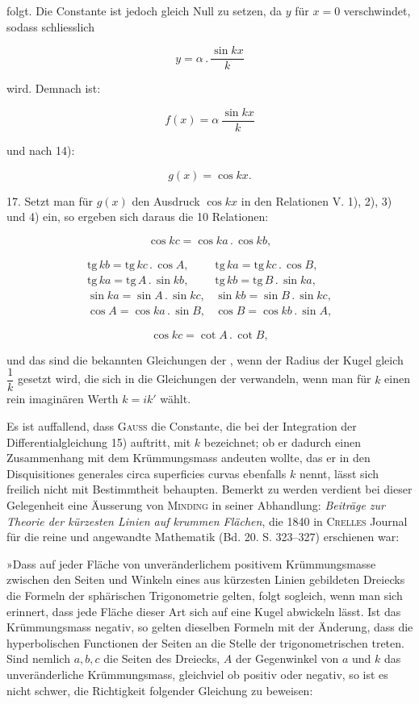%
\noindent folgt. Die Constante ist jedoch gleich Null zu setzen, da $y$ für $x = 0$ verschwindet, sodass schliesslich

\[
y = \alpha \,.\, \frac{\sin kx}{k}
\]

wird. Demnach ist:

\[
f(x) = \alpha\, \frac{\sin kx}{k}
\]

und nach 14):

\[
\tag*{(G)} g(x) = \cos kx.
\]

17. Setzt man für $g(x)$ den Ausdruck $\cos kx$ in den Relationen V. 1), 2), 3) und 4) ein, so ergeben sich daraus die 10 Relationen:

\[
\cos kc = \cos ka \,.\, \cos kb,
\]

\[
\begin{array}{cc}
\mathrm{tg}\, kb = \mathrm{tg}\, kc \,.\, \cos A, & \mathrm{tg}\, ka = \mathrm{tg}\, kc \,.\, \cos B, \\[4pt]
\mathrm{tg}\, ka = \mathrm{tg}\, A \,.\, \sin kb, & \mathrm{tg}\, kb = \mathrm{tg}\, B \,.\, \sin ka, \\[4pt]
\sin ka = \sin A \,.\, \sin kc, & \sin kb = \sin B \,.\, \sin kc, \\[4pt]
\cos A = \cos ka \,.\, \sin B, & \cos B = \cos kb \,.\, \sin A,
\end{array}
\]

\[
\cos kc = \cot A \,.\, \cot B,
\]

und das sind die bekannten Gleichungen der , wenn der Radius der Kugel gleich $\dfrac{1}{k}$ gesetzt wird, die sich in die Gleichungen der  verwandeln, wenn man für $k$ einen rein imaginären Werth $k = ik'$ wählt.

Es ist auffallend, dass \textsc{Gauss} die Constante, die bei der Integration der Differentialgleichung 15) auftritt, mit $k$ bezeichnet; ob er dadurch einen Zusammenhang mit dem Krümmungsmass andeuten wollte, das er in den Disquisitiones generales circa superficies curvas ebenfalls $k$ nennt, lässt sich freilich nicht mit Bestimmtheit behaupten. Bemerkt zu werden verdient bei dieser Gelegenheit eine Äusserung von \textsc{Minding} in seiner Abhandlung: \emph{Beiträge zur Theorie der kürzesten Linien auf krummen Flächen}, die 1840 in \textsc{Crelles} Journal für die reine und angewandte Mathematik (Bd. 20. S. 323--327) erschienen war:

»Dass auf jeder Fläche von unveränderlichem positivem Krümmungsmasse zwischen den Seiten und Winkeln eines aus kürzesten Linien gebildeten Dreiecks die Formeln der sphärischen Trigonometrie gelten, folgt sogleich, wenn man sich erinnert, dass jede Fläche dieser Art sich auf eine Kugel abwickeln lässt. Ist das Krümmungsmass negativ, so gelten dieselben Formeln mit der Änderung, dass die hyperbolischen Functionen der Seiten an die Stelle der trigonometrischen treten. Sind nemlich $a, b, c$ die Seiten des Dreiecks, $A$ der Gegenwinkel von $a$ und $k$ das unveränderliche Krümmungsmass, gleichviel ob positiv oder negativ, so ist es nicht schwer, die Richtigkeit folgender Gleichung zu beweisen:

